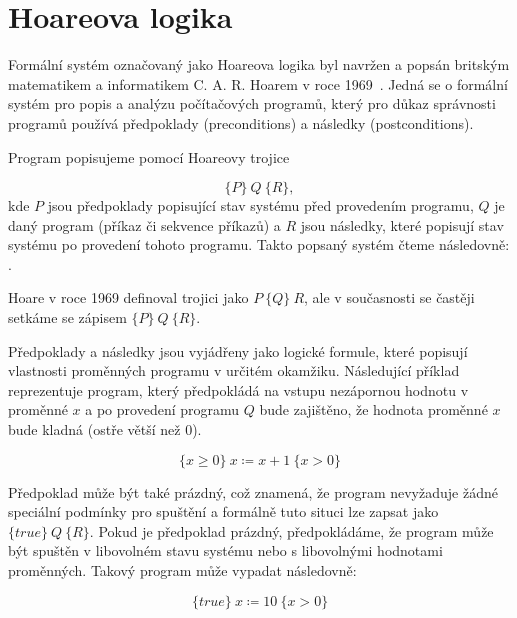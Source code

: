 \chapter{Hoareova logika}
\label{ch:hoareova-logika}

Formální systém označovaný jako Hoareova logika byl navržen a popsán
britským matematikem a informatikem C. A. R. Hoarem v roce 1969~\cite{Hoare1969}.
Jedná se o formální systém pro popis a analýzu počítačových programů,
který pro důkaz správnosti programů používá předpoklady (preconditions) a následky (postconditions).

Program popisujeme pomocí Hoareovy trojice

\begin{equation*}
    \{P\} \  Q \  \{R\},
\end{equation*}
kde $P$ jsou předpoklady popisující stav systému před provedením programu,
$Q$ je daný program (příkaz či sekvence příkazů)
a $R$ jsou následky, které popisují stav systému po provedení tohoto programu.
Takto popsaný systém čteme následovně:
.

Hoare v roce 1969 definoval trojici jako $P \ \{ Q \} \  R$,
ale v současnosti se častěji setkáme se zápisem $\{ P \} \  Q \ \{ R \}$.

Předpoklady a následky jsou vyjádřeny jako logické formule,
které popisují vlastnosti proměnných programu v určitém okamžiku.
Následující příklad reprezentuje program, který předpokládá na vstupu nezápornou hodnotu v proměnné $x$
a po provedení programu $Q$ bude zajištěno, že hodnota proměnné $x$ bude kladná (ostře větší než 0).

\begin{equation*}
    \{ x \geq 0 \} \  x \coloneqq x + 1 \  \{ x > 0 \}
\end{equation*}

Předpoklad může být také prázdný, což znamená, že program nevyžaduje žádné speciální podmínky pro spuštění
a formálně tuto situci lze zapsat jako $\{ true \} \  Q \  \{ R \}$.
Pokud je předpoklad prázdný, předpokládáme, že program může být spuštěn
v libovolném stavu systému nebo s libovolnými hodnotami proměnných.
Takový program může vypadat následovně:

\begin{equation*}
    \{ true \} \  x \coloneqq 10 \  \{ x > 0 \}
\end{equation*}


